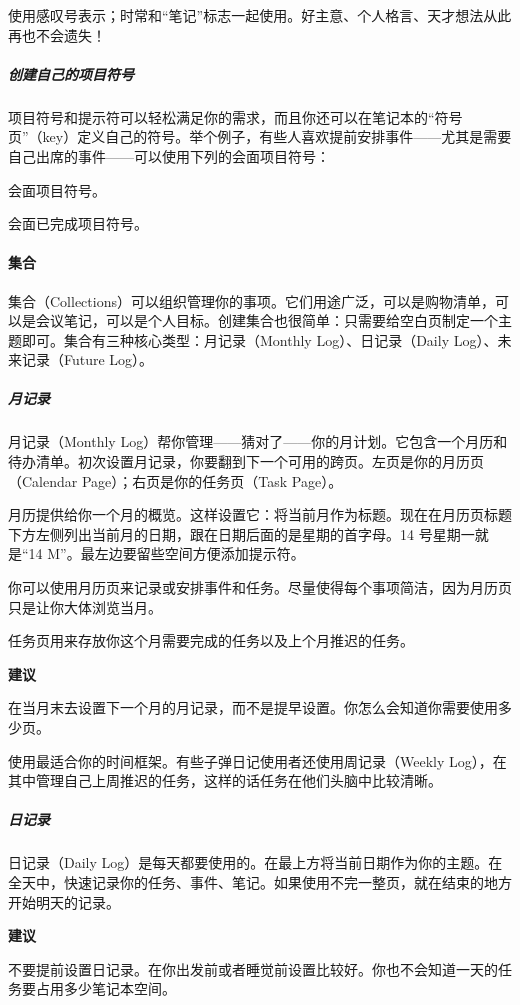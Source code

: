 \documentclass[a5paper]{article}
\begin{document}
使用感叹号表示；时常和“笔记”标志一起使用。好主意、个人格言、天才想法从此再也不会遗失！

\subparagraph{创建自己的项目符号}

项目符号和提示符可以轻松满足你的需求，而且你还可以在笔记本的“符号页”（key）定义自己的符号。举个例子，有些人喜欢提前安排事件——尤其是需要自己出席的事件——可以使用下列的会面项目符号：

会面项目符号。

会面已完成项目符号。

\clearpage

\paragraph{集合}

集合（Collections）可以组织管理你的事项。它们用途广泛，可以是购物清单，可以是会议笔记，可以是个人目标。创建集合也很简单：只需要给空白页制定一个主题即可。集合有三种核心类型：月记录（Monthly Log）、日记录（Daily Log）、未来记录（Future Log）。

\subparagraph{月记录}

月记录（Monthly Log）帮你管理——猜对了——你的月计划。它包含一个月历和待办清单。初次设置月记录，你要翻到下一个可用的跨页。左页是你的月历页（Calendar Page）；右页是你的任务页（Task Page）。

月历提供给你一个月的概览。这样设置它：将当前月作为标题。现在在月历页标题下方左侧列出当前月的日期，跟在日期后面的是星期的首字母。14 号星期一就是“14 M”。最左边要留些空间方便添加提示符。

你可以使用月历页来记录或安排事件和任务。尽量使得每个事项简洁，因为月历页只是让你大体浏览当月。

任务页用来存放你这个月需要完成的任务以及上个月推迟的任务。

\textbf{建议}

在当月末去设置下一个月的月记录，而不是提早设置。你怎么会知道你需要使用多少页。

\clearpage

使用最适合你的时间框架。有些子弹日记使用者还使用周记录（Weekly Log），在其中管理自己上周推迟的任务，这样的话任务在他们头脑中比较清晰。

\subparagraph{日记录}

日记录（Daily Log）是每天都要使用的。在最上方将当前日期作为你的主题。在全天中，快速记录你的任务、事件、笔记。如果使用不完一整页，就在结束的地方开始明天的记录。

\textbf{建议}

不要提前设置日记录。在你出发前或者睡觉前设置比较好。你也不会知道一天的任务要占用多少笔记本空间。
\end{document}
